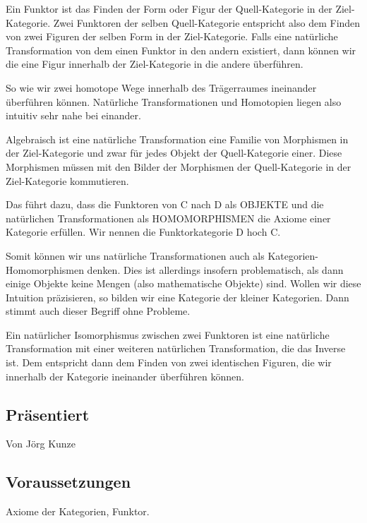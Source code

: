 \documentclass[a4paper]{amsart}
\theoremstyle{definition}
\begin{document}
Ein Funktor ist das Finden der Form oder Figur der Quell-Kategorie in der Ziel-Kategorie. Zwei Funktoren der selben Quell-Kategorie entspricht also dem Finden von zwei Figuren der selben Form in der Ziel-Kategorie. Falls eine natürliche Transformation von dem einen Funktor in den andern existiert, dann können wir die eine Figur innerhalb der Ziel-Kategorie in die andere überführen.

So wie wir zwei homotope Wege innerhalb des Trägerraumes ineinander überführen können. Natürliche Transformationen und Homotopien liegen also intuitiv sehr nahe bei einander.

Algebraisch ist eine natürliche Transformation eine Familie von Morphismen in der Ziel-Kategorie und zwar für jedes Objekt der Quell-Kategorie einer. Diese Morphismen müssen mit den Bilder der Morphismen der Quell-Kategorie in der Ziel-Kategorie kommutieren. 

Das führt dazu, dass die Funktoren von C nach D als OBJEKTE und die natürlichen Transformationen als HOMOMORPHISMEN die Axiome einer Kategorie erfüllen. Wir nennen die Funktorkategorie D hoch C. 

Somit können wir uns natürliche Transformationen auch als Kategorien-Homomorphismen denken. Dies ist allerdings insofern problematisch, als dann einige Objekte keine Mengen (also mathematische Objekte) sind. Wollen wir diese Intuition präzisieren, so bilden wir eine Kategorie der kleiner Kategorien. Dann stimmt auch dieser Begriff ohne Probleme.

Ein natürlicher Isomorphismus zwischen zwei Funktoren ist eine natürliche Transformation mit einer weiteren natürlichen Transformation, die das Inverse ist. Dem entspricht dann dem Finden von zwei identischen Figuren, die wir innerhalb der Kategorie ineinander überführen können.

\subsection*{Präsentiert}
Von Jörg Kunze

\subsection*{Voraussetzungen}
Axiome der Kategorien, Funktor.
\end{document}
